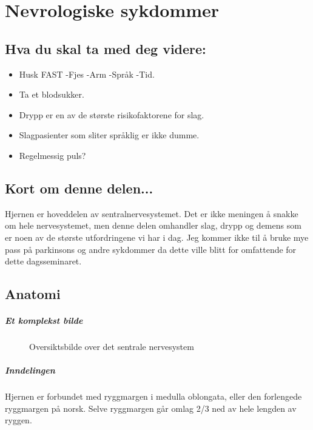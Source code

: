 \chapter{Nevrologiske sykdommer}
		\section{Hva du skal ta med deg videre:}
			\begin{itemize}
				\item Husk FAST -Fjes -Arm -Språk -Tid.\\
				\item Ta et blodsukker.\\
				\item Drypp er en av de største risikofaktorene for slag.\\
				\item Slagpasienter som sliter språklig er ikke dumme.\\
				\item Regelmessig puls?\\
			\end{itemize}
		\section{Kort om denne delen...}
			Hjernen er hoveddelen av sentralnervesystemet. Det er ikke meningen å snakke om hele nervesystemet, men denne delen omhandler slag, drypp og demens som er noen av de største utfordringene vi har i dag. Jeg kommer ikke til å bruke mye pass på parkinsons og andre sykdommer da dette ville blitt for omfattende for dette dagsseminaret.
		\section{Anatomi}
			\paragraph{Et komplekst bilde}
				\begin{figure}[ht]
                      \centering
                      \caption{Oversiktsbilde over det sentrale nervesystem}
                    \end{figure}
			\paragraph{Inndelingen\\}
				Hjernen er forbundet med ryggmargen i medulla oblongata, eller den forlengede ryggmargen på norsk. Selve ryggmargen går omlag 2/3 ned av hele lengden av ryggen. 
